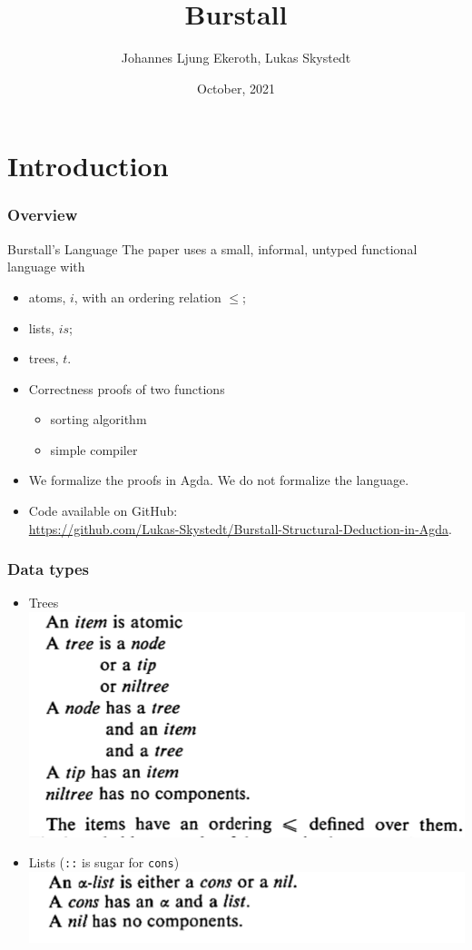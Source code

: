 \documentclass{beamer}
\title{Burstall}
\author{Johannes Ljung Ekeroth, Lukas Skystedt}
\date{October, 2021}
\newcommand{\code}[1]{\texttt{#1}}
\begin{document}
\beamertemplatenavigationsymbolsempty %
\section{Introduction}
\frame{\titlepage}
\begin{frame}[fragile]
  \frametitle{Overview}
  \begin{block}{Burstall's Language}
    The paper uses a small, informal, untyped functional language with
    \begin{itemize}
    \item atoms, $i$, with an ordering relation $\leq$;
    \item lists, $is$;
    \item trees, $t$.
    \end{itemize} 
  \end{block}
  \pause
  \begin{itemize}
  \item Correctness proofs of two functions
    \begin{itemize}
    \item sorting algorithm
    \item simple compiler
    \end{itemize} 
    \pause
  \item We formalize the proofs in Agda. We do not formalize the language.
    \pause
  \item Code available on GitHub:\\ \small \url{https://github.com/Lukas-Skystedt/Burstall-Structural-Deduction-in-Agda}.
  \end{itemize}
\end{frame}

\begin{frame}
  \frametitle{Data types}
  \begin{itemize}
  \item Trees\\
    \includegraphics[width=.6\textwidth]{./tree.png}
  \item Lists (\code{::} is sugar for \code{cons})\\
    \includegraphics[width=.6\textwidth]{./list.png}
  \end{itemize}
\end{frame} 
\end{document}
